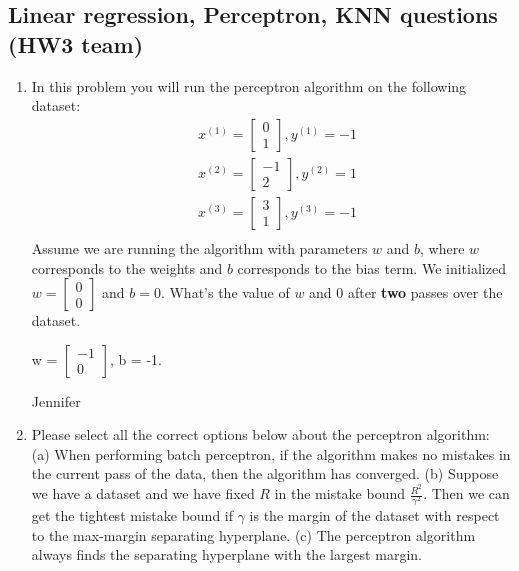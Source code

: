 \subsection{Linear regression, Perceptron, KNN questions (HW3 team)}
\begin{enumerate}
    \item In this problem you will run the perceptron algorithm on the following dataset:
    \begin{align*}
        & x^{(1)} = \begin{bmatrix} 0 \\ 1 \end{bmatrix},  y^{(1)} = -1 \\
        & x^{(2)} = \begin{bmatrix} -1 \\ 2 \end{bmatrix},  y^{(2)} = 1 \\
        & x^{(3)} = \begin{bmatrix} 3 \\ 1 \end{bmatrix},  y^{(3)} = -1 \\
    \end{align*}
    Assume we are running the algorithm with parameters $w$ and $b$, where $w$ corresponds to the weights and $b$ corresponds to the bias term. We initialized $w = \begin{bmatrix} 0 \\ 0 \end{bmatrix}$ and $b = 0$. What's the value of $w$ and $0$ after \textbf{two} passes over the dataset.
    
    \begin{soln}
    w = $\begin{bmatrix} -1 \\ 0 \end{bmatrix}$, b = -1.
    \end{soln}
    
    \begin{qauthor}
    Jennifer
    \end{qauthor}
    
    \item Please select all the correct options below about the perceptron algorithm:
    (a) When performing batch perceptron, if the algorithm makes no mistakes in the current pass of the data, then the algorithm has converged.
    (b) Suppose we have a dataset and we have fixed $R$ in the mistake bound $\frac{R^2}{\gamma^2}$. Then we can get the tightest mistake bound if $\gamma$ is the margin of the dataset with respect to the max-margin separating hyperplane. 
    (c) The perceptron algorithm always finds the separating hyperplane with the largest margin.
    

\end{enumerate}
